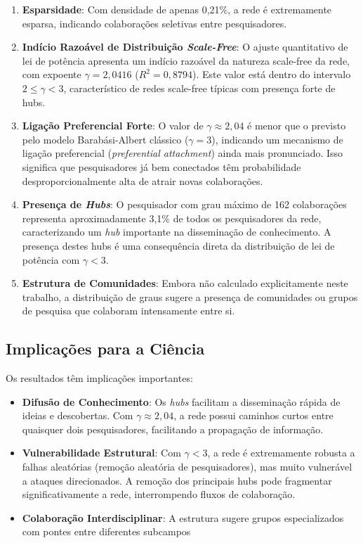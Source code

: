 \documentclass[12pt,a4paper]{article}
\begin{document}
\begin{enumerate}
    \item \textbf{Esparsidade}: Com densidade de apenas 0,21\%, a rede é extremamente esparsa, indicando colaborações seletivas entre pesquisadores.
    
    \item \textbf{Indício Razoável de Distribuição \textit{Scale-Free}}: O ajuste quantitativo de lei de potência apresenta um indício razoável da natureza scale-free da rede, com expoente $\gamma = 2,0416$ ($R^2 = 0,8794$). Este valor está dentro do intervalo $2 \leq \gamma < 3$, característico de redes scale-free típicas com presença forte de hubs.
    
    \item \textbf{Ligação Preferencial Forte}: O valor de $\gamma \approx 2,04$ é menor que o previsto pelo modelo Barabási-Albert clássico ($\gamma = 3$), indicando um mecanismo de ligação preferencial (\textit{preferential attachment}) ainda mais pronunciado. Isso significa que pesquisadores já bem conectados têm probabilidade desproporcionalmente alta de atrair novas colaborações.
    
    \item \textbf{Presença de \textit{Hubs}}: O pesquisador com grau máximo de 162 colaborações representa aproximadamente 3,1\% de todos os pesquisadores da rede, caracterizando um \textit{hub} importante na disseminação de conhecimento. A presença destes hubs é uma consequência direta da distribuição de lei de potência com $\gamma < 3$.
    
    \item \textbf{Estrutura de Comunidades}: Embora não calculado explicitamente neste trabalho, a distribuição de graus sugere a presença de comunidades ou grupos de pesquisa que colaboram intensamente entre si.
\end{enumerate}

\subsection{Implicações para a Ciência}

Os resultados têm implicações importantes:

\begin{itemize}
    \item \textbf{Difusão de Conhecimento}: Os \textit{hubs} facilitam a disseminação rápida de ideias e descobertas. Com $\gamma \approx 2,04$, a rede possui caminhos curtos entre quaisquer dois pesquisadores, facilitando a propagação de informação.
    
    \item \textbf{Vulnerabilidade Estrutural}: Com $\gamma < 3$, a rede é extremamente robusta a falhas aleatórias (remoção aleatória de pesquisadores), mas muito vulnerável a ataques direcionados. A remoção dos principais hubs pode fragmentar significativamente a rede, interrompendo fluxos de colaboração.
    \item \textbf{Colaboração Interdisciplinar}: A estrutura sugere grupos especializados com pontes entre diferentes subcampos
\end{itemize}
\end{document}
